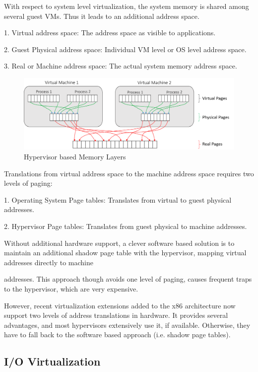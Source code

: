 With respect to system level virtualization, the system memory is shared among several guest VMs. Thus it leads to an additional address space.

1. Virtual address space: The address space as visible to applications.

2. Guest Physical address space: Individual VM level or OS level address space.

3. Real or Machine address space: The actual system memory address space. 


\setlength{\belowcaptionskip}{-10pt}

\begin{figure}[H]
  \centering
  \includegraphics[scale=0.6]{figures/hyp_mem_map_comp.png}
  \caption{Hypervisor based Memory Layers}
  \label{fig:hyper_mem}
\end{figure}

Translations from virtual address space to the machine address space requires two levels of paging:

1. Operating System Page tables: Translates from virtual to guest physical addresses.

2. Hypervisor Page tables: Translates from guest physical to machine addresses.

Without additional hardware support, a clever software based solution is to maintain an additional shadow page table with the hypervisor, mapping virtual addresses directly to machine

addresses. This approach though avoids one level of paging, causes frequent traps to the hypervisor, which are very expensive.

However, recent virtualization extensions added to the x86 architecture now support two levels of address translations in hardware. It provides several advantages, and most hypervisors extensively use it, if available. Otherwise, they have to fall back to the software based approach (i.e. shadow page tables). 


\subsection{I/O Virtualization}

